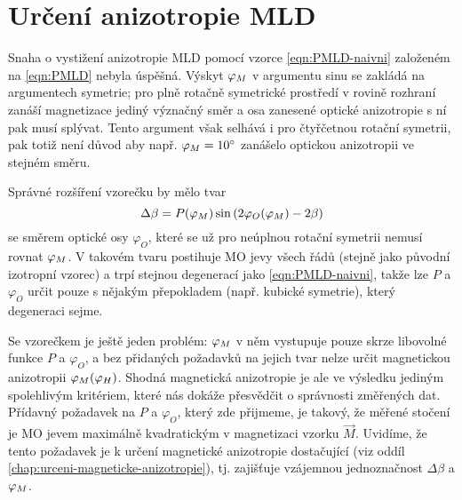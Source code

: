 \section{Určení anizotropie MLD}
\label{chap:anizotropie-MLD}

Snaha o vystižení anizotropie MLD pomocí vzorce \eqref{eqn:PMLD-naivni} založeném na \eqref{eqn:PMLD} nebyla úspěšná.
Výskyt $\varphi_M$ v argumentu sinu se zakládá na argumentech symetrie; pro plně rotačně symetrické prostředí v rovině rozhraní zanáší magnetizace jediný význačný směr a osa zanesené optické anizotropie s ní pak musí splývat.
Tento argument však selhává i pro čtyřčetnou rotační symetrii, pak totiž není důvod aby např. $\varphi_M=\SI{10}{\degree}$ zanášelo optickou anizotropii ve stejném směru.

Správné rozšíření vzorečku by mělo tvar
\begin{equation}
\label{eqn:PMLD-ansatz}
    \Delta\beta = P(\varphi_M) \sin \left( 2\varphi_O(\varphi_M) - 2\beta   \right)
\end{equation}
se směrem optické osy $\varphi_O$, které se už pro neúplnou rotační symetrii nemusí rovnat $\varphi_M$.
V takovém tvaru postihuje MO jevy všech řádů (stejně jako původní izotropní vzorec) a trpí stejnou degenerací jako \eqref{eqn:PMLD-naivni}, takže lze $P$ a $\varphi_O$ určit pouze s nějakým přepokladem (např. kubické symetrie), který degeneraci sejme.

Se vzorečkem je ještě jeden problém: $\varphi_M$ v něm vystupuje pouze skrze libovolné funkce $P$ a $\varphi_O$, a bez přidaných požadavků na jejich tvar nelze určit magnetickou anizotropii $\varphi_M(\varphi_H)$.
Shodná magnetická anizotropie je ale ve výsledku jediným spolehlivým kritériem, které nás dokáže přesvědčit o správnosti změřených dat.
Přídavný požadavek na $P$ a $\varphi_O$, který zde přijmeme, je takový, že měřené stočení je MO jevem maximálně kvadratickým v magnetizaci vzorku $\vec{M}$.
Uvidíme, že tento požadavek je k určení magnetické anizotropie dostačující (viz oddíl \ref{chap:urceni-magneticke-anizotropie}), tj. zajišťuje vzájemnou jednoznačnost $\Delta\beta$ a $\varphi_M$.

